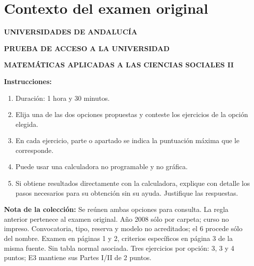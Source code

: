 \section*{Contexto del examen original}
\textbf{UNIVERSIDADES DE ANDALUCÍA}\par
\textbf{PRUEBA DE ACCESO A LA UNIVERSIDAD}\par
\textbf{MATEMÁTICAS APLICADAS A LAS CIENCIAS SOCIALES II}

\textbf{Instrucciones:}
\begin{enumerate}[label=\textbf{\alph*)}]
  \item Duración: 1 hora y 30 minutos.
  \item Elija una de las dos opciones propuestas y conteste los ejercicios de la opción elegida.
  \item En cada ejercicio, parte o apartado se indica la puntuación máxima que le corresponde.
  \item Puede usar una calculadora no programable y no gráfica.
  \item Si obtiene resultados directamente con la calculadora, explique con detalle los pasos necesarios para su obtención sin su ayuda. Justifique las respuestas.
\end{enumerate}
\noindent\textbf{Nota de la colección:} Se reúnen ambas opciones para consulta. La regla anterior pertenece al examen original. Año 2008 sólo por carpeta; curso no impreso. Convocatoria, tipo, reserva y modelo no acreditados; el 6 procede sólo del nombre. Examen en páginas 1 y 2, criterios específicos en página 3 de la misma fuente. Sin tabla normal asociada. Tres ejercicios por opción: 3, 3 y 4 puntos; E3 mantiene sus Partes I/II de 2 puntos.
\par\medskip
